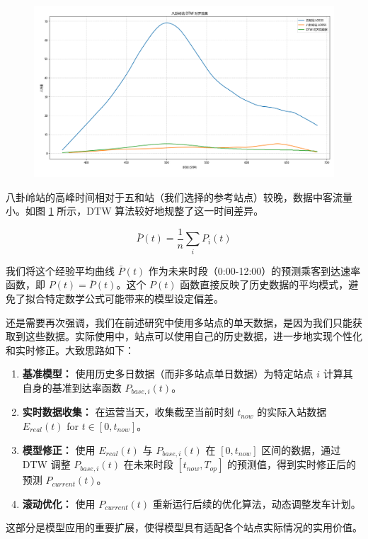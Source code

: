 \begin{figure}[htbp]
    \centering
    \includegraphics[width=1.0\textwidth]{res/Figure_5.png}
    \label{fig:alignedBagualing}
\end{figure}

八卦岭站的高峰时间相对于五和站（我们选择的参考站点）较晚，数据中客流量小。如图 \ref{fig:alignedBagualing} 所示，DTW 算法较好地规整了这一时间差异。

$$
\bar{P}(t) = \frac{1}{n} \sum_{i} P_i(t)
$$

我们将这个经验平均曲线 $\bar{P}(t)$ 作为未来时段（0:00-12:00）的预测乘客到达速率函数，即 $P(t) = \bar{P}(t)$。这个 $P(t)$ 函数直接反映了历史数据的平均模式，避免了拟合特定数学公式可能带来的模型设定偏差。


还是需要再次强调，我们在前述研究中使用多站点的单天数据，是因为我们只能获取到这些数据。实际使用中，站点可以使用自己的历史数据，进一步地实现个性化和实时修正。大致思路如下：
\begin{enumerate}
    \item \textbf{基准模型：} 使用历史多日数据（而非多站点单日数据）为特定站点 $i$ 计算其自身的基准到达率函数 $P_{base, i}(t)$。
    \item \textbf{实时数据收集：} 在运营当天，收集截至当前时刻 $t_{now}$ 的实际入站数据 $E_{real}(t)$ for $t \in [0, t_{now}]$。
    \item \textbf{模型修正：} 使用 $E_{real}(t)$ 与 $P_{base, i}(t)$ 在 $[0, t_{now}]$ 区间的数据，通过 DTW 调整 $P_{base, i}(t)$ 在未来时段 $[t_{now}, T_{op}]$ 的预测值，得到实时修正后的预测 $P_{current}(t)$。
    \item \textbf{滚动优化：} 使用 $P_{current}(t)$ 重新运行后续的优化算法，动态调整发车计划。
\end{enumerate}
这部分是模型应用的重要扩展，使得模型具有适配各个站点实际情况的实用价值。

